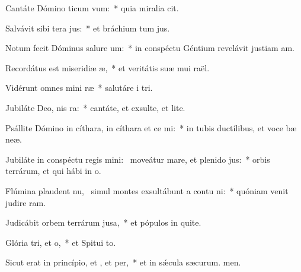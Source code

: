 \item Cantáte Dómino ticum vum:~* quia miralia cit.
\item Salvávit sibi tera jus:~* et bráchium tum jus.
\item Notum fecit Dóminus salure um:~* in conspéctu Géntium revelávit justiam am.
\item Recordátus est miseridiæ æ,~* et veritátis suæ mui raël.
\item Vidérunt omnes mini ræ~* salutáre i tri.
\item Jubiláte Deo, nis ra:~* cantáte, et exsulte, et lite.
\item Psállite Dómino in cíthara, in cíthara et ce mi:~* in tubis ductílibus, et voce bæ neæ.
\item Jubiláte in conspéctu regis mini:~\pscross{} moveátur mare, et plenido jus:~* orbis terrárum, et qui hábi in o.
\item Flúmina plaudent nu,~\pscross{} simul montes exsultábunt a contu ni:~* quóniam venit judire ram.
\item Judicábit orbem terrárum  jusa,~* et pópulos in quite.
\item Glória tri, et o,~* et Spitui to.
\item Sicut erat in princípio, et , et per,~* et in sǽcula sæcurum. men.

